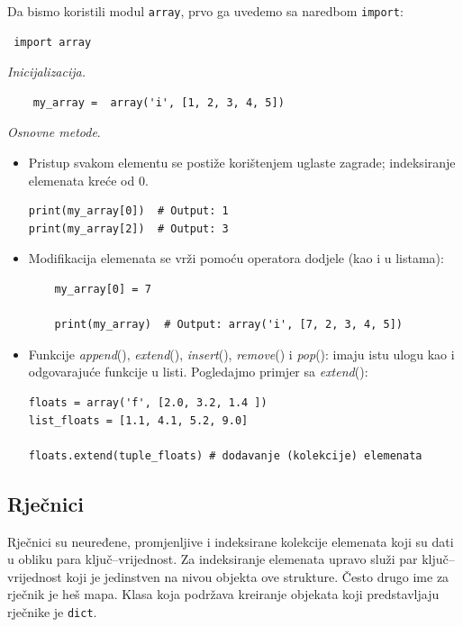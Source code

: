 Da bismo koristili modul \texttt{array}, prvo ga uvedemo sa naredbom \texttt{import}: 
\begin{verbatim}
 import array 
\end{verbatim}

\textit{Inicijalizacija. } 
\begin{verbatim}
    my_array =  array('i', [1, 2, 3, 4, 5])
\end{verbatim}

\textit{Osnovne metode}. 
\begin{itemize}
	\item Pristup svakom elementu se postiže korištenjem uglaste zagrade; inde\-ksiranje elemenata kreće od 0. 
	\begin{verbatim}
print(my_array[0])  # Output: 1
print(my_array[2])  # Output: 3
	\end{verbatim}

\item Modifikacija elemenata se vrži pomoću operatora dodjele (kao i u listama):
\begin{verbatim}
	my_array[0] = 7
	
	print(my_array)  # Output: array('i', [7, 2, 3, 4, 5])
\end{verbatim}
\item Funkcije \textit{append}(), \textit{extend}(),  \textit{insert}(), \textit{remove}() i \textit{pop}():  imaju istu ulogu kao i odgovarajuće funkcije u listi. Pogledajmo primjer sa \textit{extend}(): 
\begin{verbatim}
floats = array('f', [2.0, 3.2, 1.4 ])
list_floats = [1.1, 4.1, 5.2, 9.0]

floats.extend(tuple_floats) # dodavanje (kolekcije) elemenata
\end{verbatim} 
  
\end{itemize}


\subsection{Rječnici}
Rječnici su neuređene, promjenljive i indeksirane kolekcije elemenata koji su dati u obliku para ključ--vrijednost. Za indeksiranje elemenata upravo služi par ključ--vrijednost koji je jedinstven na nivou objekta ove strukture. Često drugo ime za rječnik je heš mapa. Klasa koja podržava kreiranje objekata koji predstavljaju rječnike je \texttt{dict}. 

